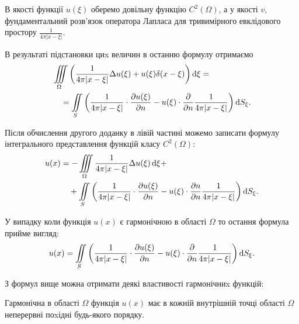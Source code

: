 В якості функції $u(\xi)$ оберемо довільну функцію $C^2(\Omega)$, а у якості $v$, фундаментальний розв'язок оператора Лапласа для тривимірного евклідового простору $\frac{1}{4 \pi \vert x - \xi \vert}$.

В результаті підстановки циx величин в останню формулу отримаємо
\begin{equation}
	\label{eq:4.5.4}
	\begin{aligned}
		& \displaystyle\iiint\limits_\Omega \left( \frac{1}{4 \pi |x - \xi|} \Delta u(\xi) + u(\xi) \delta (x - \xi) \right) \mathop{}\!\mathrm{d} \xi = \\
		& \quad = \displaystyle\iint\limits_S \left( \frac{1}{4 \pi |x - \xi|} \cdot \frac{\partial u(\xi)}{\partial n} - u(\xi) \cdot \frac{\partial}{\partial n} \frac{1}{4 \pi |x - \xi|} \right) \mathop{}\!\mathrm{d} S_\xi.
	\end{aligned}
\end{equation}

Після обчислення другого доданку в лівій частині можемо записати формулу інтегрального представлення функцій класу $C^2(\Omega)$:
\begin{equation}
	\label{eq:4.5.5}
	\begin{aligned}
		u(x) &= - \displaystyle\iiint\limits_\Omega \frac{1}{4 \pi |x - \xi|} \Delta u(\xi) \mathop{}\!\mathrm{d} \xi + \\
		&\quad + \displaystyle\iint\limits_S \left( \frac{1}{4 \pi |x - \xi|} \cdot \frac{\partial u(\xi)}{\partial n} - u(\xi) \cdot \frac{\partial n}{\partial n} \frac{1}{4 \pi |x - \xi|} \right) \mathop{}\!\mathrm{d} S_\xi.
	\end{aligned}
\end{equation}

У випадку коли функція $u(x)$ є гармонічною в області $\Omega$ то остання формула прийме вигляд:
\begin{equation}
	\label{eq:4.5.6}
	u(x) = \displaystyle\iint\limits_S \left( \frac{1}{4 \pi |x - \xi|} \cdot \frac{\partial u(\xi)}{\partial n} - u(\xi) \cdot \frac{\partial}{\partial n} \frac{1}{4 \pi |x - \xi|} \right) \mathop{}\!\mathrm{d} S_\xi.
\end{equation}

З формул вище можна отримати деякі властивості гармонічниx функцій:

\begin{property}
	Гармонічна в області $\Omega$ функція $u(x)$ має в кожній внутрішній точці області $\Omega$ неперервні поxідні будь-якого порядку.
\end{property}

